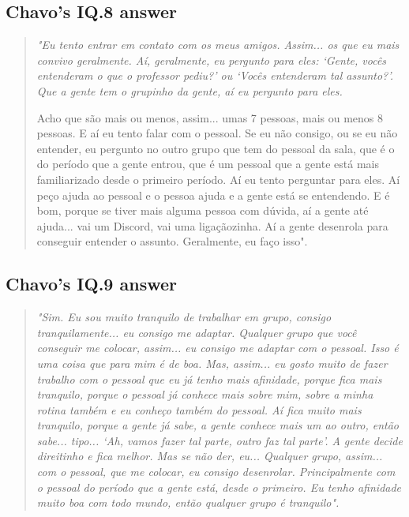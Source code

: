 
\subsection{Chavo’s IQ.8 answer}
\label{interview-exc-ss:chavo-iq8}

\begin{quote}
    \itshape
    "Eu tento entrar em contato com os meus amigos. Assim... os que eu mais convivo geralmente. Aí, geralmente, eu pergunto para eles: `Gente, vocês entenderam o que o professor pediu?' ou `Vocês entenderam tal assunto?'. Que a gente tem o grupinho da gente, aí eu pergunto para eles.

    Acho que são mais ou menos, assim... umas 7 pessoas, mais ou menos 8 pessoas. E aí eu tento falar com o pessoal. Se eu não consigo, ou se eu não entender, eu pergunto no outro grupo que tem do pessoal da sala, que é o do período que a gente entrou, que é um pessoal que a gente está mais familiarizado desde o primeiro período. Aí eu tento perguntar para eles. Aí peço ajuda ao pessoal e o pessoa ajuda e a gente está se entendendo. E é bom, porque se tiver mais alguma pessoa com dúvida, aí a gente até ajuda... vai um Discord, vai uma ligaçãozinha. Aí a gente desenrola para conseguir entender o assunto. Geralmente, eu faço isso". 
\end{quote}

\subsection{Chavo’s IQ.9 answer}
\label{interview-exc-ss:chavo-iq9}

\begin{quote}
    \itshape
    "Sim. Eu sou muito tranquilo de trabalhar em grupo, consigo tranquilamente... eu consigo me adaptar. Qualquer grupo que você conseguir me colocar, assim... eu consigo me adaptar com o pessoal. Isso é uma coisa que para mim é de boa. Mas, assim... eu gosto muito de fazer trabalho com o pessoal que eu já tenho mais afinidade, porque fica mais tranquilo, porque o pessoal já conhece mais sobre mim, sobre a minha rotina também e eu conheço também do pessoal. Aí fica muito mais tranquilo, porque a gente já sabe, a gente conhece mais um ao outro, então sabe... tipo... `Ah, vamos fazer tal parte, outro faz tal parte'. A gente decide direitinho e fica melhor. Mas se não der, eu... Qualquer grupo, assim... com o pessoal, que me colocar, eu consigo desenrolar. Principalmente com o pessoal do período que a gente está, desde o primeiro. Eu tenho afinidade muito boa com todo mundo, então qualquer grupo é tranquilo".
\end{quote}

